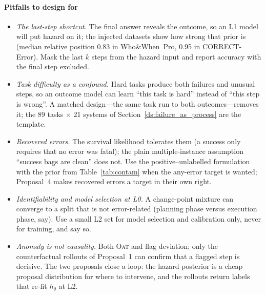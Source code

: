 \paragraph{Pitfalls to design for}
\begin{itemize}[leftmargin=1.1em]
\item \emph{The last-step shortcut.} The final answer reveals the outcome, so an L1 model will put hazard on it; the injected datasets show how strong that prior is (median relative position 0.83 in Who\&When~Pro, 0.95 in CORRECT-Error). Mask the last $k$ steps from the hazard input and report accuracy with the final step excluded.
\item \emph{Task difficulty as a confound.} Hard tasks produce both failures and unusual steps, so an outcome model can learn ``this task is hard'' instead of ``this step is wrong''. A matched design---the same task run to both outcomes---removes it; the 89 tasks $\times$ 21 systems of Section~\ref{ds:failure_as_process} are the template.
\item \emph{Recovered errors.} The survival likelihood tolerates them (a success only requires that no error was fatal); the plain multiple-instance assumption ``success bags are clean'' does not. Use the positive--unlabelled formulation with the prior from Table~\ref{tab:contam} when the any-error target is wanted; Proposal~4 makes recovered errors a target in their own right.
\item \emph{Identifiability and model selection at L0.} A change-point mixture can converge to a split that is not error-related (planning phase versus execution phase, say). Use a small L2 set for model selection and calibration only, never for training, and say so.
\item \emph{Anomaly is not causality.} Both \textsc{Oat} and  flag deviation; only the counterfactual rollouts of Proposal~1 can confirm that a flagged step is decisive. The two proposals close a loop: the hazard posterior is a cheap proposal distribution for where to intervene, and the rollouts return labels that re-fit $h_\theta$ at L2.
\end{itemize}

